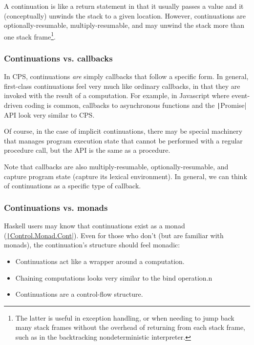 \documentclass[]{article}
\begin{document}
A continuation is like a return statement in that it usually passes a value and it (conceptually) unwinds the stack to a given location. However, continuations are optionally-resumable, multiply-resumable, and may unwind the stack more than one stack frame\footnote{The latter is useful in exception handling, or when needing to jump back many stack frames without the overhead of returning from each stack frame, such as in the backtracking nondeterministic interpreter.}.

\subsubsection{Continuations vs. callbacks}
\label{sec:call}

In CPS, continuations \textit{are} simply callbacks that follow a specific form. In general, first-class continuations feel very much like ordinary callbacks, in that they are invoked with the result of a computation. For example, in Javascript where event-driven coding is common, callbacks to asynchronous functions and the \texttt|Promise| API look very similar to CPS.

Of course, in the case of implicit continuations, there may be special machinery that manages program execution state that cannot be performed with a regular procedure call, but the API is the same as a procedure.

Note that callbacks are also multiply-resumable, optionally-resumable, and capture program state (capture its lexical environment). In general, we can think of continuations as a specific type of callback.

\subsubsection{Continuations vs. monads}
\label{sec:mona}

Haskell users may know that continuations exist as a monad (\href{https://hackage.haskell.org/package/mtl-2.2.2/docs/Control-Monad-Cont.html}{\texttt|Control.Monad.Cont|}). Even for those who don't (but are familiar with monads), the continuation's structure should feel monadic:
\begin{itemize}
\item Continuations act like a wrapper around a computation.
\item Chaining computations looks very similar to the bind operation.n
\item Continuations are a control-flow structure.
\end{itemize}
\end{document}
